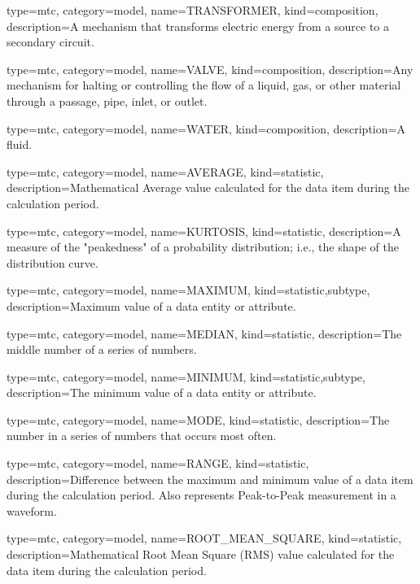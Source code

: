 {
  type=mtc,
  category=model,
  name={TRANSFORMER},
  kind={composition},
  description={A mechanism that transforms electric energy from a source to a secondary circuit.}
}


{
  type=mtc,
  category=model,
  name={VALVE},
  kind={composition},
  description={Any mechanism for halting or controlling the flow of a liquid, gas, or other material through a passage, pipe, inlet, or outlet.}
}


{
  type=mtc,
  category=model,
  name={WATER},
  kind={composition},
  description={A fluid.}
}


{
  type=mtc,
  category=model,
  name={AVERAGE},
  kind={statistic},
  description={Mathematical Average value calculated for the data item during the calculation period.}
}


{
  type=mtc,
  category=model,
  name={KURTOSIS},
  kind={statistic},
  description={A measure of the "peakedness" of a probability distribution; i.e., the shape of the distribution curve.}
}


{
  type=mtc,
  category=model,
  name={MAXIMUM},
  kind={statistic,subtype},
  description={Maximum value of a data entity or attribute.}
}


{
  type=mtc,
  category=model,
  name={MEDIAN},
  kind={statistic},
  description={The middle number of a series of numbers.}
}


{
  type=mtc,
  category=model,
  name={MINIMUM},
  kind={statistic,subtype},
  description={The minimum value of a data entity or attribute.}
}


{
  type=mtc,
  category=model,
  name={MODE},
  kind={statistic},
  description={The number in a series of numbers that occurs most often.}
}


{
  type=mtc,
  category=model,
  name={RANGE},
  kind={statistic},
  description={Difference between the maximum and minimum value of a data item during the calculation period.  Also represents Peak-to-Peak measurement in a waveform.}
}


{
  type=mtc,
  category=model,
  name={ROOT\_MEAN\_SQUARE},
  kind={statistic},
  description={Mathematical Root Mean Square (RMS) value calculated for the data item during the calculation period.}
}


